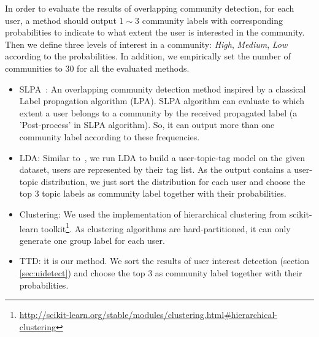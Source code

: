 In order to evaluate the results of overlapping community detection, for each user, a method should output $1\sim3$ community labels with corresponding probabilities to indicate to what extent the user is interested in the community. Then we define three levels of interest in a community: \textit{High}, \textit{Medium}, \textit{Low} according to the probabilities. In addition, we empirically set the number of communities to $30$ for all the evaluated methods.
\begin{itemize}
\item{SLPA~\cite{DBLP:journals/csur/XieKS13}}: An overlapping community detection method inspired by a classical Label propagation algorithm (LPA). SLPA algorithm can evaluate to which extent a user belongs to a community by the received propagated label (a 'Post-process' in SLPA algorithm). So, it can output more than one community label according to these frequencies.
\item{LDA}: Similar to~\cite{yang2013cqarank}, we run LDA to build a user-topic-tag model on the given dataset, users are represented by their tag list. As the output contains a user-topic distribution, we just sort the distribution for each user and choose the top 3 topic labels as community label together with their probabilities.
\item{Clustering}: We used the implementation of hierarchical clustering from scikit-learn toolkit\footnote{\url{http://scikit-learn.org/stable/modules/clustering.html#hierarchical-clustering}}. As clustering algorithms are hard-partitioned, it can only generate one group label for each user.
\item{TTD}: it is our method. We sort the results of user interest detection (section \ref{sec:uidetect}) and choose the top 3 as community label together with their probabilities.
\end{itemize}



